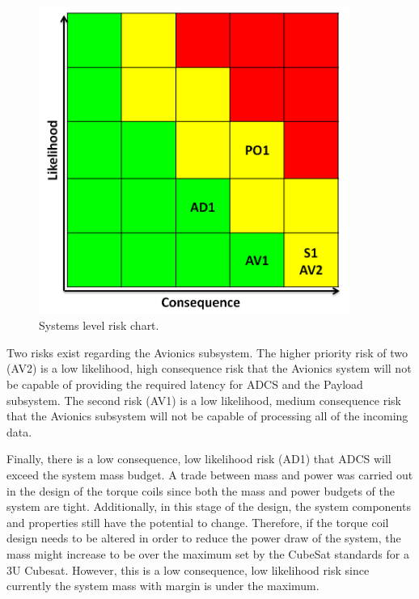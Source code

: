\documentclass[12pt]{article}
\begin{document}
\begin{figure}[ht]
\centering
\includegraphics[width=4in]{images/conclusion_1.png}
\caption{Systems level risk chart.}
\label{fig:risk_chart}
\end{figure}

Two risks exist regarding the Avionics subsystem.  The higher priority risk of two (AV2) is a low likelihood, high consequence risk that the Avionics system will not be capable of providing the required latency for ADCS and the Payload subsystem.  The second risk (AV1) is a low likelihood, medium consequence risk that the Avionics subsystem will not be capable of processing all of the incoming data.  

Finally, there is a low consequence, low likelihood risk (AD1) that ADCS will exceed the system mass budget.  A trade between mass and power was carried out in the design of the torque coils since both the mass and power budgets of the system are tight.  Additionally, in this stage of the design, the system components and properties still have the potential to change.  Therefore, if the torque coil design needs to be altered in order to reduce the power draw of the system, the mass might increase to be over the maximum set by the CubeSat standards for a 3U Cubesat.  However, this is a low consequence, low likelihood risk since currently the system mass with margin is under the maximum.
\end{document}
